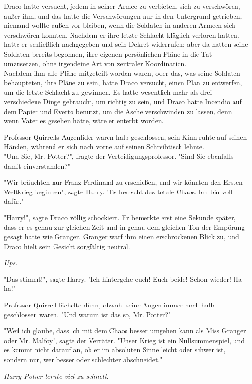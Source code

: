{Draco hatte versucht, jedem in seiner Armee zu verbieten, sich zu verschwören, außer ihm, und das hatte die Verschwörungen nur in den Untergrund getrieben, niemand wollte außen vor bleiben, wenn die Soldaten in anderen Armeen sich verschwören konnten. Nachdem er ihre letzte Schlacht kläglich verloren hatten, hatte er schließlich nachgegeben und sein Dekret widerrufen; aber da hatten seine Soldaten bereits begonnen, ihre eigenen persönlichen Pläne in die Tat umzusetzen, ohne irgendeine Art von zentraler Koordination.\\ Nachdem ihm alle Pläne mitgeteilt worden waren, oder das, was seine Soldaten behaupteten, ihre Pläne zu sein, hatte Draco versucht, einen Plan zu entwerfen, um die letzte Schlacht zu gewinnen. Es hatte wesentlich mehr als drei verschiedene Dinge gebraucht, um richtig zu sein, und Draco hatte Incendio auf dem Papier und Everto benutzt, um die Asche verschwinden zu lassen, denn wenn Vater es gesehen hätte, wäre er enterbt worden.

Professor Quirrells Augenlider waren halb geschlossen, sein Kinn ruhte auf seinen Händen, während er sich nach vorne auf seinen Schreibtisch lehnte.\\ "Und Sie, Mr. Potter?", fragte der Verteidigungsprofessor. "Sind Sie ebenfalls damit einverstanden?"

"Wir bräuchten nur Franz Ferdinand zu erschießen, und wir könnten den Ersten Weltkrieg beginnen", sagte Harry. "Es herrscht das totale Chaos. Ich bin voll dafür."

"Harry!", sagte Draco völlig schockiert. Er bemerkte erst eine Sekunde später, dass er es genau zur gleichen Zeit und in genau dem gleichen Ton der Empörung gesagt hatte wie Granger. Granger warf ihm einen erschrockenen Blick zu, und Draco hielt sein Gesicht sorgfältig neutral.

\emph{Ups}.

"Das stimmt!", sagte Harry. "Ich hintergehe euch! Euch beide! Schon wieder! Ha ha!"

Professor Quirrell lächelte dünn, obwohl seine Augen immer noch halb geschlossen waren. "Und warum ist das so, Mr. Potter?"

"Weil ich glaube, dass ich mit dem Chaos besser umgehen kann als Miss Granger oder Mr. Malfoy", sagte der Verräter. "Unser Krieg ist ein Nullsummenspiel, und es kommt nicht darauf an, ob er im absoluten Sinne leicht oder schwer ist, sondern nur, wer besser oder schlechter abschneidet."

\emph{Harry Potter lernte viel zu schnell.}

}
